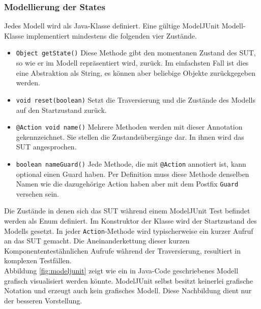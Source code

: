 \subsubsection{Modellierung der States}
Jedes Modell wird als Java-Klasse definiert. Eine gültige ModelJUnit Modell-Klasse implementiert mindestens die folgenden vier Zustände. 

\begin{itemize}
\item \texttt{Object getState()} Diese Methode gibt den momentanen Zustand des SUT, so wie er im Modell repräsentiert wird, zurück. Im einfachsten Fall ist dies eine Abstraktion als String, es können aber beliebige Objekte zurückgegeben werden.
\item \texttt{void reset(boolean)} Setzt die Traversierung und die Zustände des Modells auf den Startzustand zurück.
\item \texttt{@Action void name()} Mehrere Methoden werden mit dieser Annotation gekennzeichnet. Sie stellen die Zustandsübergänge dar. In ihnen wird das \Gls{SUT} angesprochen.
\item \texttt{boolean nameGuard()} Jede Methode, die mit \texttt{@Action} annotiert ist, kann optional einen Guard haben. Per Definition muss diese Methode denselben Namen wie die dazugehörige Action haben aber mit dem Postfix \texttt{Guard} versehen sein.
\end{itemize}

Die Zustände in denen sich das \Gls{SUT} während einem ModelJUnit Test befindet werden als Enum definiert. Im Konstruktor der Klasse wird der Startzustand des Modells gesetzt. In jeder \texttt{Action}-Methode wird typischerweise ein kurzer Aufruf an das \Gls{SUT} gemacht. Die Aneinanderkettung dieser kurzen Komponententestähnlichen Aufrufe während der Traversierung, resultiert in komplexen Testfällen.\\
Abbildung \ref{fig:modeljunit} zeigt wie ein in Java-Code geschriebenes Modell grafisch visualisiert werden könnte.  ModelJUnit selbst besitzt keinerlei grafische Notation und erzeugt auch kein grafisches Modell. Diese Nachbildung dient nur der besseren Vorstellung.

